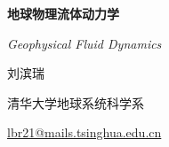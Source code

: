\begin{titlepage}
    \centering

    \vspace*{5cm}

    \vfill
    {\Huge\bfseries 地球物理流体动力学 \par}
    \vspace{0.4cm}
    {\large \textit{Geophysical Fluid Dynamics} \par}
    \vfill

    \vspace{10cm}
    {\large{} 刘滨瑞 \par}
    \vspace{0.2cm}
    {\normalsize{} 清华大学地球系统科学系 \par}
    \vspace{0.2cm}
    {\normalsize \href{mailto:lbr21@mails.tsinghua.edu.cn}{lbr21@mails.tsinghua.edu.cn} \par}

    \vfill

\end{titlepage}
